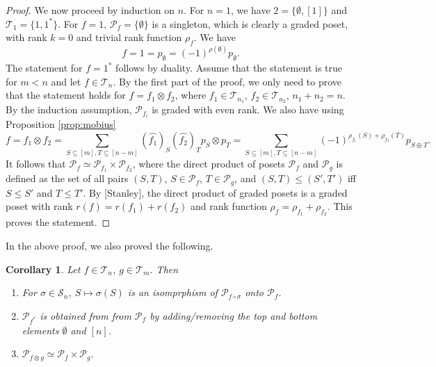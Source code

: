 \documentclass[12pt]{article}
\newtheorem{coro}{Corollary}
\theoremstyle{definition}
\theoremstyle{remark}
\def\Te{\mathcal T}
\def\Pe{\mathcal P}
\def\permut{\mathscr{S}}
\begin{document}
\begin{proof}
We now proceed by induction on $n$. For $n=1$, we have $2=\{\emptyset, [1]\}$ and
$\Te_1=\{1,1^*\}$. For $f=1$, $\mathcal P_f=\{\emptyset\}$ is a singleton, which 
is clearly a graded poset, with rank $k=0$ and trivial rank function $\rho_f$.  We have
\[
f = 1=p_\emptyset=(-1)^{\rho(\emptyset)}p_\emptyset.
\]
The statement for $f=1^*$ follows by duality. Assume that the statement is true for $m<n$ and let $f\in \Te_n$.
 By the first part of the proof,  we only need to prove
that the statement holds for $f=f_1\otimes f_2$, where $f_1\in \Te_{n_1}$, $f_2\in
\Te_{n_2}$, $n_1+n_2=n$.  By the induction
assumption, $\Pe_{f_i}$ is graded with even rank. We also
have using Proposition \ref{prop:mobius}
\[
f=f_1\otimes f_2=\sum_{S\subseteq [m], T\subseteq [n-m]} (\widehat {f_1})_S(\widehat
{f_2})_T p_S\otimes p_T=
\sum_{S\subseteq [m], T\subseteq [n-m]}(-1)^{\rho_{f_1}(S)+\rho_{f_2}(T)}p_{S\oplus T}.
\]
It follows that $\Pe_f\simeq \Pe_{f_1}\times \Pe_{f_2}$, where the direct product of posets $\Pe_f$ and
$\Pe_g$ is defined as the set of all pairs $(S,T)$, $S\in \Pe_f$, $T\in \Pe_g$, and
$(S,T)\le (S',T')$ iff $S\le S'$ and $T\le T'$.
By [Stanley], the direct product of graded posets 
is a graded poset with rank $r(f)=r(f_1)+r(f_2)$ and rank function
$\rho_f=\rho_{f_1}+\rho_{f_2}$.  This
proves the statement. 

\end{proof}

In the above proof, we also proved the following.

\begin{coro}\label{coro:Pf} Let $f\in \Te_n$, $g\in \Te_m$. Then
\begin{enumerate}
\item[(i)] For $\sigma\in \permut_n$, $S\mapsto \sigma(S)$ is an
isomprphism  of  $\mathcal P_{f\circ \sigma}$ onto $\mathcal P_{f}$.
\item[(ii)] $\Pe_{f^*}$ is obtained from from $\Pe_f$ by adding/removing the top and bottom
elements $\emptyset$ and $[n]$.
\item[(iii)] $\Pe_{f\otimes g}\simeq \Pe_f\times \Pe_g$.
\end{enumerate}


\end{coro}
\end{document}
